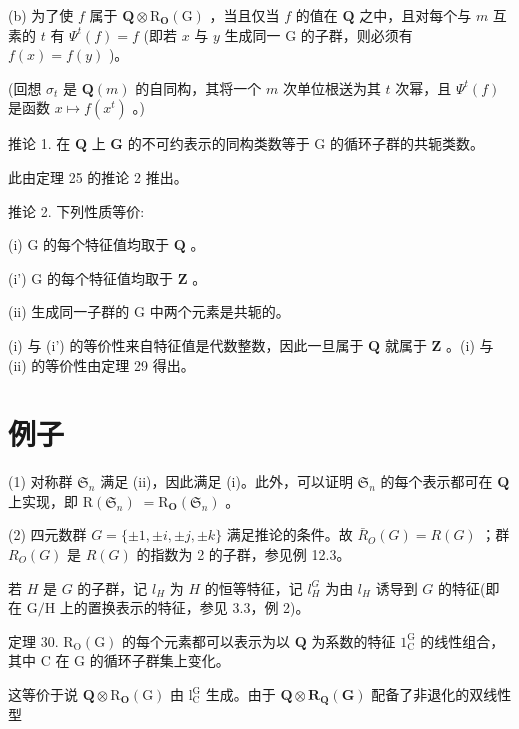\documentclass[10pt]{article}
\begin{document}
(b) 为了使 \(f\) 属于 \(\mathbf{Q} \otimes  {\mathrm{R}}_{\mathbf{O}}\left( \mathrm{G}\right)\) ，当且仅当 \(f\) 的值在 \(\mathbf{Q}\) 之中，且对每个与 \(m\) 互素的 \(t\) 有 \({\Psi }^{t}\left( f\right)  = f\) (即若 \(x\) 与 \(y\) 生成同一 \(\mathrm{G}\) 的子群，则必须有 \(f\left( x\right)  = f\left( y\right)\) )。

(回想 \({\sigma }_{t}\) 是 \(\mathbf{Q}\left( m\right)\) 的自同构，其将一个 \(m\) 次单位根送为其 \(t\) 次幂，且 \({\Psi }^{t}\left( f\right)\) 是函数 \(x \mapsto  f\left( {x}^{t}\right)\) 。)

推论 1. 在 \(\mathbf{Q}\) 上 \(\mathbf{G}\) 的不可约表示的同构类数等于 \(\mathrm{G}\) 的循环子群的共轭类数。

此由定理 25 的推论 2 推出。

推论 2. 下列性质等价:

(i) \(\mathrm{G}\) 的每个特征值均取于 \(\mathbf{Q}\) 。

(i') \(\mathrm{G}\) 的每个特征值均取于 \(\mathbf{Z}\) 。

(ii) 生成同一子群的 \(\mathrm{G}\) 中两个元素是共轭的。

(i) 与 (i') 的等价性来自特征值是代数整数，因此一旦属于 \(\mathbf{Q}\) 就属于 \(\mathbf{Z}\) 。(i) 与 (ii) 的等价性由定理 29 得出。

\section*{例子}

(1) 对称群 \({\mathfrak{S}}_{n}\) 满足 (ii)，因此满足 (i)。此外，可以证明 \({\mathfrak{S}}_{n}\) 的每个表示都可在 \(\mathbf{Q}\) 上实现，即 \(\mathrm{R}\left( {\mathfrak{S}}_{n}\right) \; = {\mathrm{R}}_{\mathbf{O}}\left( {\mathfrak{S}}_{n}\right)\) 。

(2) 四元数群 \(G = \{  \pm  1, \pm  i, \pm  j, \pm  k\}\) 满足推论的条件。故 \({\bar{R}}_{O}\left( G\right)  = R\left( G\right)\) ；群 \({R}_{O}\left( G\right)\) 是 \(R\left( G\right)\) 的指数为 2 的子群，参见例 12.3。

若 \(H\) 是 \(G\) 的子群，记 \({l}_{H}\) 为 \(H\) 的恒等特征，记 \({l}_{H}^{G}\) 为由 \({l}_{H}\) 诱导到 \(G\) 的特征(即在 \(\mathrm{G}/\mathrm{H}\) 上的置换表示的特征，参见 3.3，例 2)。

定理 30. \({\mathrm{R}}_{\mathrm{O}}\left( \mathrm{G}\right)\) 的每个元素都可以表示为以 \(\mathbf{Q}\) 为系数的特征 \({1}_{\mathrm{C}}^{\mathrm{G}}\) 的线性组合，其中 \(\mathrm{C}\) 在 \(\mathrm{G}\) 的循环子群集上变化。

这等价于说 \(\mathbf{Q} \otimes  {\mathrm{R}}_{\mathbf{O}}\left( \mathrm{G}\right)\) 由 \({\mathrm{l}}_{\mathrm{C}}^{\mathrm{G}}\) 生成。由于 \(\mathbf{Q} \otimes  {\mathbf{R}}_{\mathbf{Q}}\left( \mathbf{G}\right)\) 配备了非退化的双线性型
\end{document}
